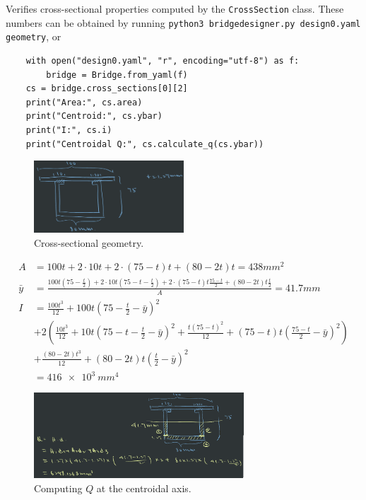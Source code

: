 \documentclass{article}
\begin{document}
Verifies cross-sectional properties computed by the \texttt{CrossSection} class.
These numbers can be obtained by running \texttt{python3 bridgedesigner.py design0.yaml geometry}, or
\begin{verbatim}
    with open("design0.yaml", "r", encoding="utf-8") as f:
        bridge = Bridge.from_yaml(f)
    cs = bridge.cross_sections[0][2]
    print("Area:", cs.area)
    print("Centroid:", cs.ybar)
    print("I:", cs.i)
    print("Centroidal Q:", cs.calculate_q(cs.ybar))
\end{verbatim}

\begin{figure}[h]
    \centering
    \includegraphics[width=0.5\textwidth]{cs.png}
    \caption{Cross-sectional geometry.}
\end{figure}

\begin{align*}
    A &= 100t + 2 \cdot 10t + 2 \cdot (75 - t)t + (80 - 2t)t = 438\si{mm^2} \\
    \bar{y} &= \frac{100t\left(75 - \frac{t}{2}\right) + 2 \cdot 10t(75 - t - \frac{t}{2}) + 2 \cdot (75 - t)t\frac{75 - t}{2} + (80 - 2t)t\frac{t}{2}}{A} = 41.7\si{mm}\\
    I &= \frac{100t^3}{12} + 100t\left(75 - \frac{t}{2} - \bar{y}\right)^2 \\
        & + 2\left(\frac{10t^3}{12} + 10t\left(75 - t - \frac{t}{2} - \bar{y}\right)^2 + \frac{t(75 - t)^2}{12} + (75 - t)t\left(\frac{75 - t}{2} - \bar{y}\right)^2\right) \\
        &+ \frac{(80 - 2t)t^3}{12} + (80 - 2t)t\left(\frac{t}{2} - \bar{y}\right)^2 \\
      &= \SI{416e3}{mm^4}
\end{align*}

\begin{figure}[h]
    \centering
    \includegraphics[width=0.7\textwidth]{qcent.png}
    \caption{Computing \(Q\) at the centroidal axis.}
\end{figure}
\end{document}
